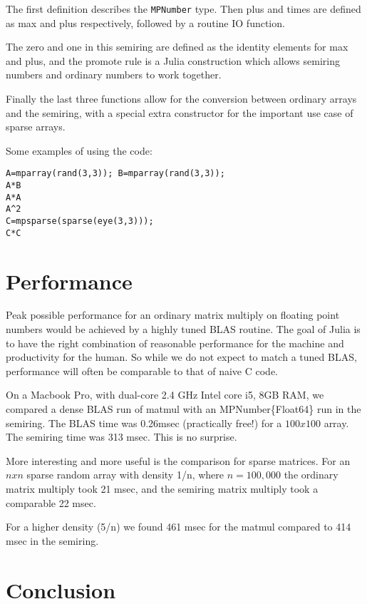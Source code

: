 \documentclass[conference]{IEEEtran}
\begin{document}
The first definition describes the \verb+MPNumber+ type.
Then plus and times are defined as max and plus respectively, followed by
a routine IO function.

The zero and one in this semiring are defined as the identity elements for max and plus,
and the promote rule is a Julia construction which allows semiring numbers and ordinary
numbers to work together.

Finally the last three functions allow for the conversion between ordinary arrays and the semiring, with a special extra constructor for the important use case of sparse arrays.

Some examples of using the code:


\begin{verbatim}
A=mparray(rand(3,3)); B=mparray(rand(3,3));
A*B
A*A
A^2
C=mpsparse(sparse(eye(3,3)));
C*C
\end{verbatim}





\section{Performance}

Peak possible performance for an ordinary matrix multiply on floating point numbers
would be achieved by a highly tuned BLAS routine.
The goal of Julia is to have the right combination of reasonable performance
for the machine and productivity for the human.  So while we do not expect to match
a tuned BLAS, performance will often be comparable to that of naive C code.

On a Macbook Pro, with dual-core 2.4 GHz Intel core i5, 8GB RAM, we compared a dense BLAS run of matmul with an MPNumber\{Float64\} run in the semiring.
The BLAS time was 0.26msec (practically free!) for a $100x100$ array.  The semiring time
was 313 msec.  This is no surprise.

More interesting and more useful is the comparison for sparse matrices.  For an $n x n$ sparse random array with density 1/n, where $n = 100,000$ the ordinary matrix multiply took 21 msec, and the semiring matrix multiply took a comparable 22 msec.

For a higher density (5/n) we found 461 msec for the matmul compared to 414 msec in the semiring.




\section{Conclusion}
\end{document}
